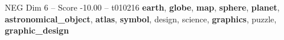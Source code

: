 \begin{textsample}{NEG Dim 6 – Score -10.00 – t010216}  \label{ex:f6_neg_012}
\textbf{earth}, \textbf{globe}, \textbf{map}, \textbf{sphere}, \textbf{planet}, \textbf{astronomical\_object}, \textbf{atlas}, \textbf{symbol}, design, science, \textbf{graphics}, puzzle, \textbf{graphic\_design}

\end{textsample}
